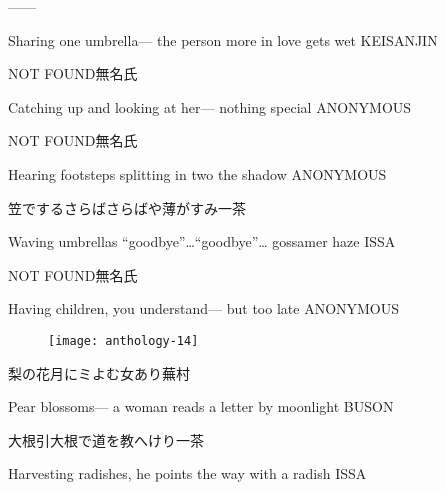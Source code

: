 \begin{haiku}
   ---\hfill{---}

    \vin{} Sharing one umbrella---
    \vin{} \vin{} the person more in love
    \vin{} \vin{} \vin{} gets wet \hspace{\fill} KEISANJIN
\end{haiku}

\begin{haiku}
    {NOT FOUND}\hfill{\FH 無名氏}

    \vin{} Catching up
    \vin{} \vin{} and looking at her---
    \vin{} \vin{} \vin{} nothing special \hspace{\fill} ANONYMOUS
\end{haiku}

\begin{haiku}
    {NOT FOUND}\hfill{\FH 無名氏}

    \vin{} Hearing footsteps
    \vin{} \vin{} splitting in two
    \vin{} \vin{} \vin{} the shadow \hspace{\fill} ANONYMOUS
\end{haiku}

\begin{haiku}
    {\FH 笠でするさらばさらばや薄がすみ}\hfill{\FH 一茶}

    \vin{} Waving umbrellas
    \vin{} \vin{} ``goodbye''\ldots``goodbye''\ldots
    \vin{} \vin{} \vin{} gossamer haze \hspace{\fill} ISSA
\end{haiku}

\begin{haiku}
    {NOT FOUND}\hfill{\FH 無名氏}

    \vin{} Having children,
    \vin{} \vin{} you understand---
    \vin{} \vin{} \vin{} but too late \hspace{\fill} ANONYMOUS
\end{haiku}

\begin{figure}
    \texttt{[image: anthology-14]}
\end{figure}

\begin{haiku}
    {\FH 梨の花月にミよむ女あり}\hfill{\FH 蕪村}

    \vin{} Pear blossoms---
    \vin{} \vin{} a woman reads a letter
    \vin{} \vin{} \vin{} by moonlight \hspace{\fill} BUSON
\end{haiku}

\begin{haiku}
    {\FH 大根引大根で道を教へけり}\hfill{\FH 一茶}

    \vin{} Harvesting radishes,
    \vin{} \vin{} he points the way
    \vin{} \vin{} \vin{} with a radish \hspace{\fill} ISSA
\end{haiku}

